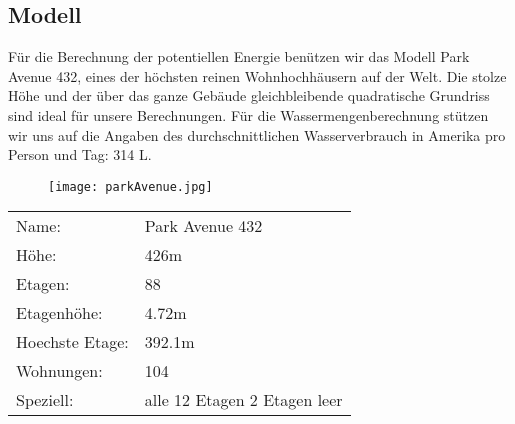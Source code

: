 \subsection{Modell} \label{subsec:modell}

Für die Berechnung der potentiellen Energie benützen wir das Modell Park Avenue 432, eines der höchsten reinen Wohnhochhäusern auf der Welt. Die stolze Höhe und der über das ganze Gebäude gleichbleibende quadratische Grundriss sind ideal für unsere Berechnungen. Für die Wassermengenberechnung stützen wir uns auf die Angaben des durchschnittlichen Wasserverbrauch in Amerika pro Person und Tag: 314 L. \cite{waterUsAmerica}
\begin{figure}[H]
\centering
\texttt{[image: parkAvenue.jpg]}

\end{figure}
\begin{table}[H]
\begin{tabular}{ll}
Name:				& Park Avenue 432\\
Höhe: 				& 426m\\          
Etagen:				& 88\\
Etagenhöhe:			&4.72m\\
Hoechste Etage:		&392.1m\\
Wohnungen:			&104\\
Speziell:			&alle 12 Etagen 2 Etagen leer\\           
\end{tabular}
\end{table}

